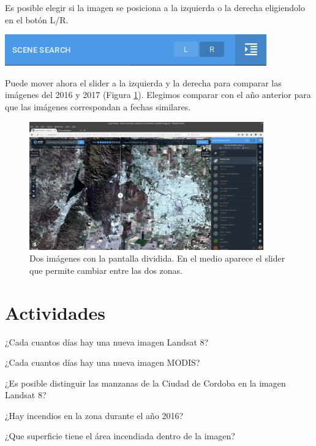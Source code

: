 \documentclass[a4paper,12pt]{book}
\begin{document}
Es posible elegir si la imagen se posiciona a la izquierda o la derecha eligiendolo en el botón L/R.

\begin{center}\includegraphics[scale=0.4]{in:LorR.png}\end{center}

Puede mover ahora el slider a la izquierda y la derecha para comparar las imágenes del 2016 y 2017 (Figura \ref{fig:slider}). Elegimos comparar con el año anterior para que las imágenes correspondan a fechas similares.

\begin{figure}[h!]
    \centering
    \includegraphics[width=0.9\textwidth]{fig:slider.png}
    \caption{Dos imágenes con la pantalla dividida. En el medio aparece el slider que permite cambiar entre las dos zonas.}
    \label{fig:slider}
\end{figure}

\section{Actividades}
\begin{que}
    ¿Cada cuantos días hay una nueva imagen Landsat 8?
\end{que}
\begin{que}
    ¿Cada cuantos días hay una nueva imagen MODIS?
\end{que}
\begin{que}
    ¿Es posible distinguir las manzanas de la Ciudad de Cordoba en la imagen Landsat 8?
\end{que}
\begin{que}
    ¿Hay incendios en la zona durante el año 2016?
\end{que}
\begin{que}
    ¿Que superficie tiene el área incendiada dentro de la imagen?
\end{que}
\end{document}
